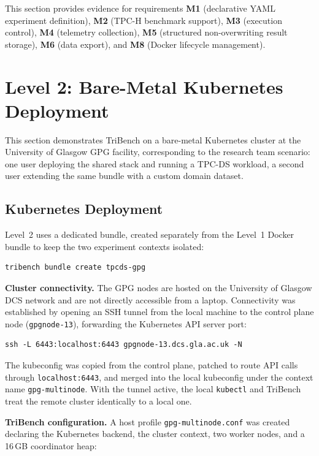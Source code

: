 \documentclass{l4proj}
\begin{document}
\noindent This section provides evidence for requirements \textbf{M1} (declarative YAML experiment definition), \textbf{M2} (TPC-H benchmark support), \textbf{M3} (execution control), \textbf{M4} (telemetry collection), \textbf{M5} (structured non-overwriting result storage), \textbf{M6} (data export), and \textbf{M8} (Docker lifecycle management).

\section{Level 2: Bare-Metal Kubernetes Deployment}
\label{sec:eval_l2}

This section demonstrates TriBench on a bare-metal Kubernetes cluster at the University of Glasgow GPG facility, corresponding to the research team scenario: one user deploying the shared stack and running a TPC-DS workload, a second user extending the same bundle with a custom domain dataset.

\subsection{Kubernetes Deployment}
\label{sec:eval_l2_deploy}

Level~2 uses a dedicated bundle, created separately from the Level~1 Docker bundle to keep the two experiment contexts isolated:

\begin{verbatim}
tribench bundle create tpcds-gpg
\end{verbatim}

\noindent \textbf{Cluster connectivity.} The GPG nodes are hosted on the University of Glasgow DCS network and are not directly accessible from a laptop. Connectivity was established by opening an SSH tunnel from the local machine to the control plane node (\texttt{gpgnode-13}), forwarding the Kubernetes API server port:

\begin{verbatim}
ssh -L 6443:localhost:6443 gpgnode-13.dcs.gla.ac.uk -N
\end{verbatim}

\noindent The kubeconfig was copied from the control plane, patched to route API calls through \texttt{localhost:6443}, and merged into the local kubeconfig under the context name \texttt{gpg-multinode}. With the tunnel active, the local \texttt{kubectl} and TriBench treat the remote cluster identically to a local one.

\noindent \textbf{TriBench configuration.} A host profile \texttt{gpg-multinode.conf} was created declaring the Kubernetes backend, the cluster context, two worker nodes, and a 16\,GB coordinator heap:
\end{document}
